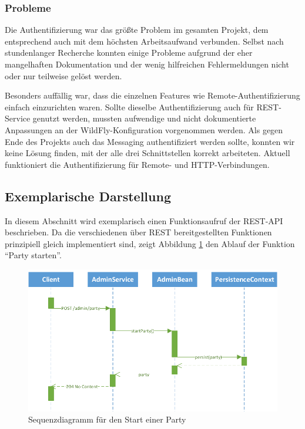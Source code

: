 \subsubsection{Probleme}
Die Authentifizierung war das größte Problem im gesamten Projekt, dem entsprechend auch mit dem höchsten Arbeitsaufwand verbunden. Selbst nach stundenlanger Recherche konnten einige Probleme aufgrund der eher mangelhaften Dokumentation und der wenig hilfreichen Fehlermeldungen nicht oder nur teilweise gelöst werden.

Besonders auffällig war, dass die einzelnen Features wie Remote-Authentifizierung einfach einzurichten waren. Sollte dieselbe Authentifizierung auch für REST-Service genutzt werden, mussten aufwendige und nicht dokumentierte Anpassungen an der WildFly-Konfiguration vorgenommen werden. Als gegen Ende des Projekts auch das Messaging authentifiziert werden sollte, konnten wir keine Lösung finden, mit der alle drei Schnittstellen korrekt arbeiteten. Aktuell funktioniert die Authentifizierung für Remote- und HTTP-Verbindungen. 


\subsection{Exemplarische Darstellung}
In diesem Abschnitt wird exemplarisch einen Funktionsaufruf der REST-API beschrieben. Da die verschiedenen über REST bereitgestellten Funktionen prinzipiell gleich implementiert sind, zeigt Abbildung \ref{fig:AufrufSequenz} den Ablauf der Funktion "`Party starten"'.

\begin{figure}[tbh]
\centering
\includegraphics[width=1.0\linewidth]{Bilder/AufrufSequenz}
\caption{Sequenzdiagramm für den Start einer Party}
\label{fig:AufrufSequenz}
\end{figure}

